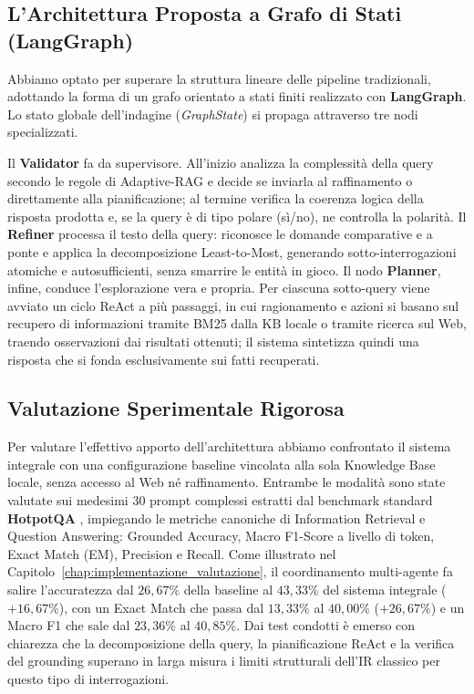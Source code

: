 \subsection{L'Architettura Proposta a Grafo di Stati (LangGraph)}
Abbiamo optato per superare la struttura lineare delle pipeline tradizionali, adottando la forma di un grafo orientato a stati finiti realizzato con \textbf{LangGraph}. Lo stato globale dell'indagine (\textit{GraphState}) si propaga attraverso tre nodi specializzati.

Il \textbf{Validator} fa da supervisore. All'inizio analizza la complessità della query secondo le regole di Adaptive-RAG e decide se inviarla al raffinamento o direttamente alla pianificazione; al termine verifica la coerenza logica della risposta prodotta e, se la query è di tipo polare (sì/no), ne controlla la polarità. Il \textbf{Refiner} processa il testo della query: riconosce le domande comparative e a ponte e applica la decomposizione Least-to-Most, generando sotto-interrogazioni atomiche e autosufficienti, senza smarrire le entità in gioco. Il nodo \textbf{Planner}, infine, conduce l'esplorazione vera e propria. Per ciascuna sotto-query viene avviato un ciclo ReAct a più passaggi, in cui ragionamento e azioni si basano sul recupero di informazioni tramite BM25 dalla KB locale o tramite ricerca sul Web, traendo osservazioni dai risultati ottenuti; il sistema sintetizza quindi una risposta che si fonda esclusivamente sui fatti recuperati.

\subsection{Valutazione Sperimentale Rigorosa}
Per valutare l'effettivo apporto dell'architettura abbiamo confrontato il sistema integrale con una configurazione baseline vincolata alla sola Knowledge Base locale, senza accesso al Web né raffinamento. Entrambe le modalità sono state valutate sui medesimi 30 prompt complessi estratti dal benchmark standard \textbf{HotpotQA} \cite{yang2018hotpotqa}, impiegando le metriche canoniche di Information Retrieval e Question Answering: Grounded Accuracy, Macro F1-Score a livello di token, Exact Match (EM), Precision e Recall. Come illustrato nel Capitolo~\ref{chap:implementazione_valutazione}, il coordinamento multi-agente fa salire l'accuratezza dal $26,67\%$ della baseline al $43,33\%$ del sistema integrale ($+16,67\%$), con un Exact Match che passa dal $13,33\%$ al $40,00\%$ ($+26,67\%$) e un Macro F1 che sale dal $23,36\%$ al $40,85\%$. Dai test condotti è emerso con chiarezza che la decomposizione della query, la pianificazione ReAct e la verifica del grounding superano in larga misura i limiti strutturali dell'IR classico per questo tipo di interrogazioni.

